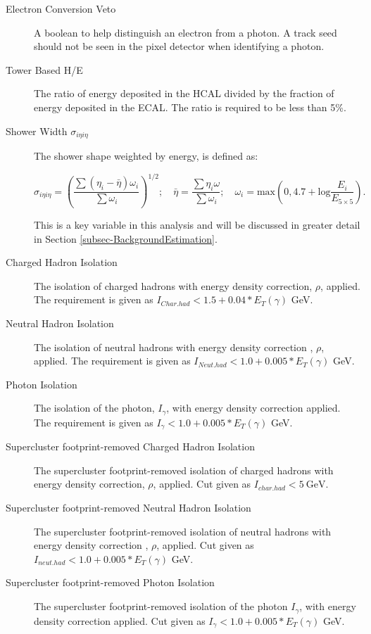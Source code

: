 \begin{description}

\item[Electron Conversion Veto] A boolean to help distinguish an electron from a photon. A track seed should not be seen in the pixel detector when identifying a photon. 

\item[Tower Based H/E] The ratio of energy deposited in the HCAL divided by the fraction of energy deposited in the ECAL. The ratio is required to be less than 5\%.

\item[Shower Width $\sigma_{i\eta i\eta}$] The shower shape weighted by energy, is defined as: 

\begin{equation}
\sigma_{i\eta i\eta} = \left(\frac{\sum(\eta_i - \bar{\eta})\omega_i}{\sum\omega_i}\right)^{1/2}; \quad \bar{\eta} = \frac{\sum\eta_i\omega}{\sum\omega_i}; \quad  \omega_i = \text{max}\left(0, 4.7 +
\text{log}\frac{E_i}{E_{5\times5}}\right).
\end{equation}

This is a key variable in this analysis and will be discussed in greater detail in Section \ref{subsec-BackgroundEstimation}.

\item[Charged Hadron Isolation] The isolation of charged hadrons with energy density correction, $\rho$, applied. The requirement is given as $I_{Char.had} < 1.5 + 0.04*E_T(\gamma)$ GeV. 

\item[Neutral Hadron Isolation] The isolation of neutral hadrons with energy density correction , $\rho$, applied. The requirement is given as $I_{Neut.had} < 1.0 + 0.005*E_T(\gamma)$ GeV. 

\item[Photon Isolation] The isolation of the photon, $I_{\gamma}$, with energy density correction applied. The requirement is given as $I_{\gamma} < 1.0 + 0.005*E_T(\gamma)$ GeV.


\item[Supercluster footprint-removed Charged Hadron Isolation] The supercluster footprint-removed isolation of charged hadrons with energy density correction, $\rho$, applied.
Cut given as $I_{char.had} < 5 \ \text{GeV} $. 

\item[Supercluster footprint-removed Neutral Hadron Isolation] The supercluster footprint-removed isolation of neutral hadrons with energy density correction , $\rho$, applied.
Cut given as $I_{neut.had} < 1.0 + 0.005*E_T(\gamma)$ GeV. 

\item[Supercluster footprint-removed Photon Isolation] The supercluster footprint-removed isolation of the photon $I_{\gamma}$, with energy density correction applied. Cut given
as $I_{\gamma} < 1.0 + 0.005*E_T(\gamma)$ GeV. 

\end{description}

